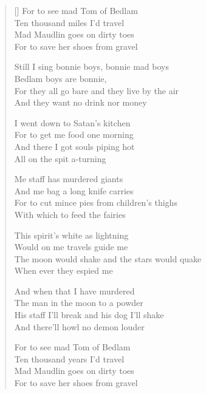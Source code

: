 \pagebreak
\settowidth{\versewidth}{And there I got souls piping hot}
\begin{verse}[\versewidth]
For to see mad Tom of Bedlam\\
Ten thousand miles I'd travel\\
Mad Maudlin goes on dirty toes\\
For to save her shoes from gravel


\begin{chorus}
Still I sing bonnie boys, bonnie mad boys\\
    Bedlam boys are bonnie,\\
    For they all go bare and they live by the air\\
    And they want no drink nor money
    \end{chorus}

I went down to Satan's kitchen\\
For to get me food one morning\\
And there I got souls piping hot\\
All on the spit a-turning

Me staff has murdered giants\\
And me bag a long knife carries\\
For to cut mince pies from children's thighs\\
With which to feed the fairies

This spirit's white as lightning\\
Would on me travels guide me\\
The moon would shake and the stars would quake\\
When ever they espied me

And when that I have murdered\\
The man in the moon to a powder\\
His staff I'll break and his dog I'll shake\\
And there'll howl no demon louder

For to see mad Tom of Bedlam\\
Ten thousand years I'd travel\\
Mad Maudlin goes on dirty toes\\
For to save her shoes from gravel

\end{verse}
